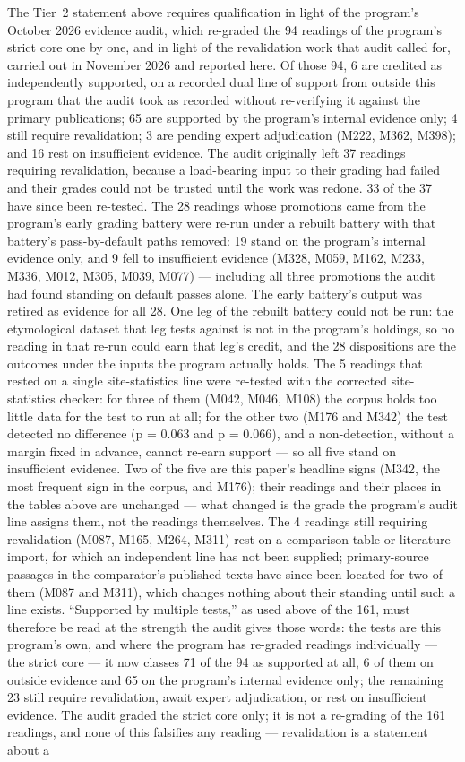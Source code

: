 \documentclass[11pt]{article}
\newcounter{none} %
\begin{document}
The Tier~2 statement above requires qualification in light of the program's October 2026 evidence audit, which re-graded the 94 readings of the program's strict core one by one, and in light of the revalidation work that audit called for, carried out in November 2026 and reported here. Of those 94, 6 are credited as independently supported, on a recorded dual line of support from outside this program that the audit took as recorded without re-verifying it against the primary publications; 65 are supported by the program's internal evidence only; 4 still require revalidation; 3 are pending expert adjudication (M222, M362, M398); and 16 rest on insufficient evidence. The audit originally left 37 readings requiring revalidation, because a load-bearing input to their grading had failed and their grades could not be trusted until the work was redone. 33 of the 37 have since been re-tested. The 28 readings whose promotions came from the program's early grading battery were re-run under a rebuilt battery with that battery's pass-by-default paths removed: 19 stand on the program's internal evidence only, and 9 fell to insufficient evidence (M328, M059, M162, M233, M336, M012, M305, M039, M077) --- including all three promotions the audit had found standing on default passes alone. The early battery's output was retired as evidence for all 28. One leg of the rebuilt battery could not be run: the etymological dataset that leg tests against is not in the program's holdings, so no reading in that re-run could earn that leg's credit, and the 28 dispositions are the outcomes under the inputs the program actually holds. The 5 readings that rested on a single site-statistics line were re-tested with the corrected site-statistics checker: for three of them (M042, M046, M108) the corpus holds too little data for the test to run at all; for the other two (M176 and M342) the test detected no difference (p = 0.063 and p = 0.066), and a non-detection, without a margin fixed in advance, cannot re-earn support --- so all five stand on insufficient evidence. Two of the five are this paper's headline signs (M342, the most frequent sign in the corpus, and M176); their readings and their places in the tables above are unchanged --- what changed is the grade the program's audit line assigns them, not the readings themselves. The 4 readings still requiring revalidation (M087, M165, M264, M311) rest on a comparison-table or literature import, for which an independent line has not been supplied; primary-source passages in the comparator's published texts have since been located for two of them (M087 and M311), which changes nothing about their standing until such a line exists. ``Supported by multiple tests,'' as used above of the 161, must therefore be read at the strength the audit gives those words: the tests are this program's own, and where the program has re-graded readings individually --- the strict core --- it now classes 71 of the 94 as supported at all, 6 of them on outside evidence and 65 on the program's internal evidence only; the remaining 23 still require revalidation, await expert adjudication, or rest on insufficient evidence. The audit graded the strict core only; it is not a re-grading of the 161 readings, and none of this falsifies any reading --- revalidation is a statement about a 
\end{document}
